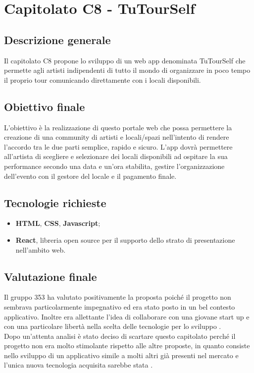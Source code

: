 \documentclass[StudioDiFattibilità.tex]{subfiles}
\begin{document}
\chapter{Capitolato C8 - TuTourSelf}
\section{Descrizione generale}
Il capitolato C8 propone lo sviluppo di un web app denominata TuTourSelf che permette agli artisti indipendenti di tutto il mondo di organizzare in poco tempo il proprio tour comunicando direttamente con i locali disponibili.
\section{Obiettivo finale}
L’obiettivo è la realizzazione di questo portale web che possa permettere la creazione di una community di artisti e locali/spazi nell’intento di rendere l’accordo tra le due parti semplice, rapido e sicuro. L’app dovrà permettere all’artista di scegliere e selezionare dei locali disponibili ad ospitare la sua performance secondo una data e un’ora stabilita, gestire l’organizzazione dell’evento con il gestore del locale e il pagamento finale.
\section{Tecnologie richieste}
\begin{itemize}
	\item \textbf{HTML}, \textbf{CSS}, \textbf{Javascript};
	\item \textbf{React}, libreria open source  per il supporto dello strato di presentazione nell'ambito web.
\end{itemize}
\section{Valutazione finale}
Il gruppo 353 ha valutato positivamente la proposta poiché il progetto non sembrava particolarmente impegnativo ed era stato posto in un bel contesto applicativo. Inoltre era allettante l’idea di collaborare con una giovane start up e con una particolare libertà nella scelta delle tecnologie per lo sviluppo .\\
Dopo un’attenta analisi è stato deciso di scartare questo capitolato perché il progetto non era molto stimolante rispetto alle altre proposte, in quanto consiste nello sviluppo di un applicativo simile a molti altri già presenti nel mercato e l’unica nuova tecnologia acquisita sarebbe stata .
\end{document}

